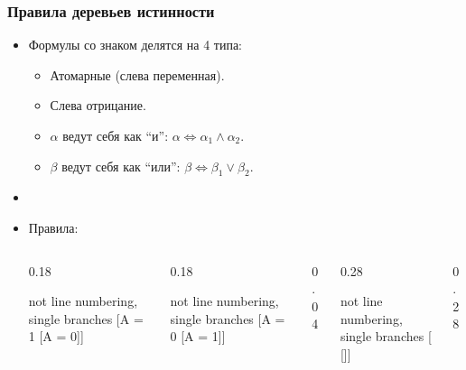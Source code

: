 \begin{frame}
\frametitle{Правила деревьев истинности}
\begin{itemize}
    \item Формулы со знаком делятся на 4 типа:
    \begin{itemize}
        \item Атомарные (слева переменная).
        \item Слева отрицание.
        \item $\alpha$ ведут себя как \enquote{и}: $\alpha \Leftrightarrow \alpha_1 \land \alpha_2$.
        \item $\beta$ ведут себя как \enquote{или}: $\beta \Leftrightarrow \beta_1 \lor \beta_2$.
    \end{itemize}
    \pause
    \item[]
    \item Правила:
\begin{columns}
    \begin{column}{0.18\textwidth}
        \begin{center}
            \begin{tableau}{not line numbering, single branches}
                [{\neg A = 1} [{A = 0}]]
            \end{tableau}
        \end{center}
    \end{column}
    \begin{column}{0.18\textwidth}
        \begin{center}
            \begin{tableau}{not line numbering, single branches}
                [{\neg A = 0} [{A = 1}]]
            \end{tableau}
        \end{center}
    \end{column}
    \begin{column}{0.04\textwidth}
    \end{column}
    \begin{column}{0.28\textwidth}
        \begin{center}
            \begin{tableau}{not line numbering, single branches}
                [{\alpha} [{}]]
            \end{tableau}
        \end{center}
    \end{column}
    \begin{column}{0.28\textwidth}

\end{column}
\end{columns}
\end{itemize}
\end{frame}
